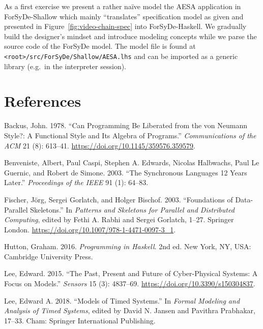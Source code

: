 \documentclass[
  a4paper,
]{article}
\begin{document}
As a first exercise we present a rather naïve model the AESA application
in ForSyDe-Shallow which mainly ``translates'' specification model as
given and presented in Figure~\ref{fig:video-chain-spec} into
ForSyDe-Haskell. We gradually build the designer's mindset and introduce
modeling concepts while we parse the source code of the ForSyDe model.
The model file is found at
\texttt{\textless{}root\textgreater{}/src/ForSyDe/Shallow/AESA.lhs} and
can be imported as a generic library (e.g.~in the interpreter session).

\hypertarget{references}{%
\section*{References}\label{references}}

\hypertarget{refs}{}
\leavevmode\hypertarget{ref-backus-1978}{}%
Backus, John. 1978. ``Can Programming Be Liberated from the von Neumann
Style?: A Functional Style and Its Algebra of Programs.''
\emph{Communications of the ACM} 21 (8): 613--41.
\url{https://doi.org/10.1145/359576.359579}.

\leavevmode\hypertarget{ref-Benveniste03}{}%
Benveniste, Albert, Paul Caspi, Stephen A. Edwards, Nicolas Halbwachs,
Paul Le Guernic, and Robert de Simone. 2003. ``The Synchronous Languages
12 Years Later.'' \emph{Proceedings of the IEEE} 91 (1): 64--83.

\leavevmode\hypertarget{ref-Fischer-2003}{}%
Fischer, Jörg, Sergei Gorlatch, and Holger Bischof. 2003. ``Foundations
of Data-Parallel Skeletons.'' In \emph{Patterns and Skeletons for
Parallel and Distributed Computing}, edited by Fethi A. Rabhi and Sergei
Gorlatch, 1--27. Springer London.
\url{https://doi.org/10.1007/978-1-4471-0097-3_1}.

\leavevmode\hypertarget{ref-hutton-2016}{}%
Hutton, Graham. 2016. \emph{Programming in Haskell}. 2nd ed. New York,
NY, USA: Cambridge University Press.

\leavevmode\hypertarget{ref-lee-2015}{}%
Lee, Edward. 2015. ``The Past, Present and Future of Cyber-Physical
Systems: A Focus on Models.'' \emph{Sensors} 15 (3): 4837--69.
\url{https://doi.org/10.3390/s150304837}.

\leavevmode\hypertarget{ref-Lee18}{}%
Lee, Edward A. 2018. ``Models of Timed Systems.'' In \emph{Formal
Modeling and Analysis of Timed Systems}, edited by David N. Jansen and
Pavithra Prabhakar, 17--33. Cham: Springer International Publishing.
\end{document}
